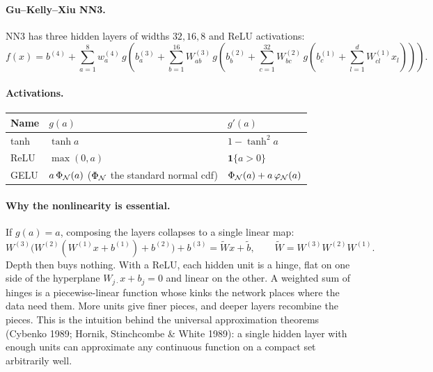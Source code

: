 \paragraph{Gu--Kelly--Xiu NN3.} NN3 has three hidden layers of widths $32,16,8$ and ReLU activations:
\begin{equation}
f(x)=b^{(4)}+\sum_{a=1}^{8}w^{(4)}_a\,g\!\left(b^{(3)}_a+\sum_{b=1}^{16}W^{(3)}_{ab}\,g\!\left(b^{(2)}_b+\sum_{c=1}^{32}W^{(2)}_{bc}\,g\!\left(b^{(1)}_c+\sum_{l=1}^{d}W^{(1)}_{cl}x_l\right)\right)\right).
\end{equation}

\paragraph{Activations.}
\begin{center}
\renewcommand{\arraystretch}{1.3}
\begin{tabular}{@{}lll@{}}
\toprule
Name & $g(a)$ & $g'(a)$ \\
\midrule
tanh & $\tanh a$ & $1-\tanh^2 a$ \\
ReLU & $\max(0,a)$ & $\mathbf 1\{a>0\}$ \\
GELU & $a\,\Phi_{\mathcal{N}}(a)$ ($\Phi_{\mathcal{N}}$ the standard normal cdf) & $\Phi_{\mathcal{N}}(a)+a\,\varphi_{\mathcal{N}}(a)$ \\
\bottomrule
\end{tabular}
\end{center}

\paragraph{Why the nonlinearity is essential.} If $g(a)=a$, composing the layers collapses to a single linear map:
\begin{equation}
W^{(3)}\big(W^{(2)}(W^{(1)}x+b^{(1)})+b^{(2)}\big)+b^{(3)}=\tilde W x+\tilde b,\qquad \tilde W=W^{(3)}W^{(2)}W^{(1)}.
\end{equation}
Depth then buys nothing. With a ReLU, each hidden unit is a hinge, flat on one side of the hyperplane $W_{j\cdot}x+b_j=0$ and linear on the other. A weighted sum of hinges is a piecewise-linear function whose kinks the network places where the data need them. More units give finer pieces, and deeper layers recombine the pieces. This is the intuition behind the universal approximation theorems (Cybenko 1989; Hornik, Stinchcombe \& White 1989): a single hidden layer with enough units can approximate any continuous function on a compact set arbitrarily well.


